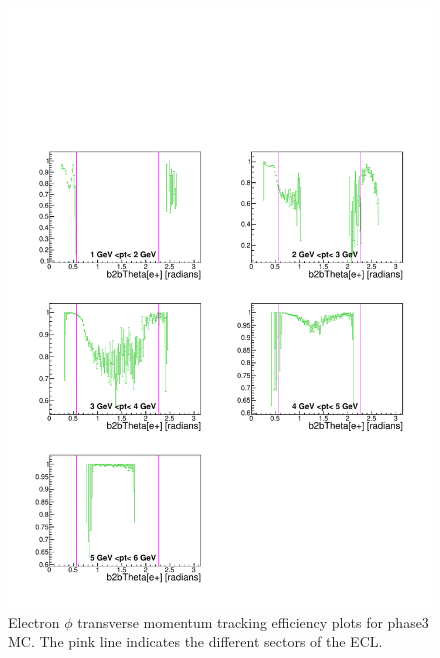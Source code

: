 \documentclass[a4paper,11pt,twosided,final,german,openbib,pdftex,listof=totoc,bibliography=totoc]{scrbook}
\begin{document}
\begin{appendix}
\clearpage

\begin{figure}[!htbp]
	\centering
	\includegraphics[width=\textwidth]{Plots/master3/xPtMThetaem_MCP3}
	\caption[Transverse Momentum $\theta$ Electron Efficiency Phase3 MC]{Electron $\phi$ transverse momentum tracking efficiency plots for phase3 MC. The pink line indicates the different sectors of the ECL.}
	\label{plt:PtMThetaem3_MC}
\end{figure}



\end{appendix}
\end{document}
